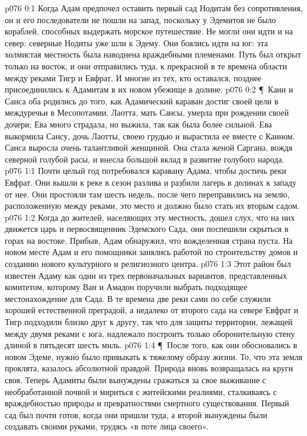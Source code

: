 \vs p076 0:1 Когда Адам предпочел оставить первый сад Нодитам без сопротивления, он и его последователи не пошли на запад, поскольку у Эдемитов не было кораблей, способных выдержать морское путешествие. Не могли они идти и на север: северные Нодиты уже шли к Эдему. Они боялись идти на юг: эта холмистая местность была наводнена враждебными племенами. Путь был открыт только на восток, и они отправились туда, к прекрасной в те времена области между реками Тигр и Евфрат. И многие из тех, кто оставался, позднее присоединились к Адамитам в их новом убежище в долине.
\vs p076 0:2 \P\ Каин и Санса оба родились до того, как Адамический караван достиг своей цели в междуречьи в Месопотамии. Лаотта, мать Сансы, умерла при рождении своей дочери; Ева много страдала, но выжила, так как была более сильной. Ева выкормила Сансу, дочь Лаотты, своею грудью и вырастила ее вместе с Каином. Санса выросла очень талантливой женщиной. Она стала женой Саргана, вождя северной голубой расы, и внесла большой вклад в развитие голубого народа.
\vs p076 1:1 Почти целый год потребовался каравану Адама, чтобы достичь реки Евфрат. Они вышли к реке в сезон разлива и разбили лагерь в долинах к западу от нее. Они простояли там шесть недель, после чего переправились на землю, расположенную между реками, это место и должно было стать их вторым садом.
\vs p076 1:2 Когда до жителей, населяющих эту местность, дошел слух, что на них движется царь и первосвященник Эдемского Сада, они поспешили скрыться в горах на востоке. Прибыв, Адам обнаружил, что вожделенная страна пуста. На новом месте Адам и его помощники занялись работой по строительству домов и созданию нового культурного и религиозного центра.
\vs p076 1:3 Этот район был известен Адаму как один из трех первоначальных вариантов, представленных комитетом, которому Ван и Амадон поручили выбрать подходящее местонахождение для Сада. В те времена две реки сами по себе служили хорошей естественной преградой, а недалеко от второго сада на севере Евфрат и Тигр подходили близко друг к другу, так что для защиты территории, лежащей между двумя реками с юга, надлежало построить только оборонительную стену длиной в пятьдесят шесть миль.
\vs p076 1:4 \P\ После того, как они обосновались в новом Эдеме, нужно было привыкать к тяжелому образу жизни. То, что эта земля проклята, казалось абсолютной правдой. Природа вновь возвращалась на круги своя. Теперь Адамиты были вынуждены сражаться за свое выживание с необработанной почвой и мириться с житейскими реалиями, сталкиваясь с враждебностью природы и превратностями смертного существования. Первый сад был почти готов, когда они пришли туда, а второй вынуждены были создавать своими руками, трудясь «в поте лица своего».
